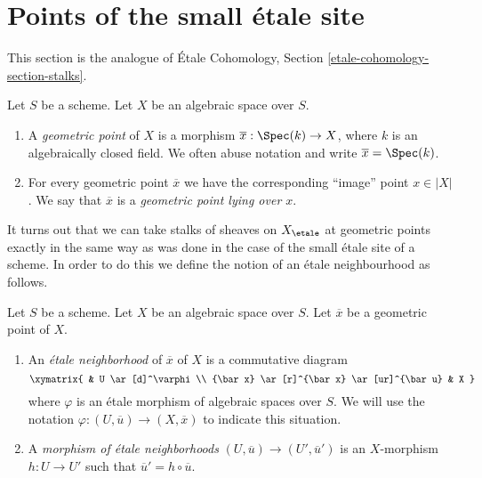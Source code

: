 \section{Points of the small \'etale site}
\label{section-points-small-etale-site}

\noindent
This section is the analogue of
\'Etale Cohomology, Section
\ref{etale-cohomology-section-stalks}.

\begin{definition}
\label{definition-geometric-point}
Let $S$ be a scheme. Let $X$ be an algebraic space over $S$.
\begin{enumerate}
\item A {\it geometric point} of $X$ is a morphism
$\overline{x} : \Spec(k) \to X$, where $k$ is an algebraically
closed field. We often abuse notation and
write $\overline{x} = \Spec(k)$.
\item For every geometric point $\overline{x}$ we have the corresponding
``image'' point $x \in |X|$. We say that $\overline{x}$ is a
{\it geometric point lying over $x$}.
\end{enumerate}
\end{definition}

\noindent
It turns out that we can take stalks of sheaves on $X_\etale$
at geometric points exactly in the same way as was done in the
case of the small \'etale site of a scheme. In order to do this we
define the notion of an \'etale neighbourhood as follows.

\begin{definition}
\label{definition-etale-neighbourhood}
Let $S$ be a scheme. Let $X$ be an algebraic space over $S$.
Let $\overline{x}$ be a geometric point of $X$.
\begin{enumerate}
\item An {\it \'etale neighborhood} of $\overline{x}$
of $X$ is a commutative diagram
$$
\xymatrix{
& U \ar[d]^\varphi \\
{\bar x} \ar[r]^{\bar x} \ar[ur]^{\bar u} & X
}
$$
where $\varphi$ is an \'etale morphism of algebraic spaces over $S$.
We will use the notation $\varphi : (U, \overline{u}) \to (X, \overline{x})$
to indicate this situation.
\item A {\it morphism of \'etale neighborhoods}
$(U, \overline{u}) \to (U', \overline{u}')$
is an $X$-morphism $h : U \to U'$
such that $\overline{u}' = h \circ \overline{u}$.
\end{enumerate}
\end{definition}

